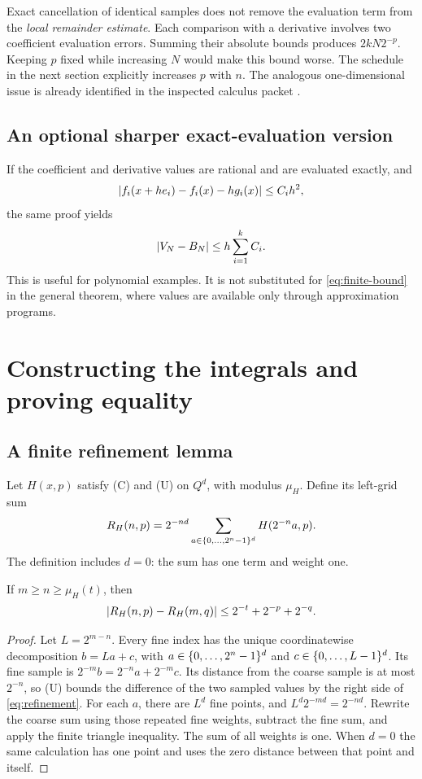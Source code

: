 \begin{remark}
Exact cancellation of identical samples does not remove the evaluation
term from the \emph{local remainder estimate}. Each comparison with a
derivative involves two coefficient evaluation errors. Summing their
absolute bounds produces $2kN2^{-p}$. Keeping $p$ fixed while increasing $N$
would make this bound worse. The schedule in the next section explicitly
increases $p$ with $n$. The analogous one-dimensional issue is already
identified in the inspected calculus packet \cite{repo-calculus}.
\end{remark}

\subsection{An optional sharper exact-evaluation version}

If the coefficient and derivative values are rational and are evaluated
exactly, and
\[
 \left|f_i(x+he_i)-f_i(x)-hg_i(x)\right|\le C_i h^2,
\]
the same proof yields
\[
 \left|V_N-B_N\right|\le h\sum_{i=1}^kC_i.
\]
This is useful for polynomial examples. It is not substituted for
\eqref{eq:finite-bound} in the general theorem, where values are available
only through approximation programs.

\FloatBarrier
\section{Constructing the integrals and proving equality}\label{sec:names-proof}

\subsection{A finite refinement lemma}

Let $H(x,p)$ satisfy (C) and (U) on $Q^d$, with modulus $\mu_H$.
Define its left-grid sum
\[
 R_H(n,p)=2^{-nd}\sum_{a\in\{0,\ldots,2^n-1\}^{d}}H(2^{-n}a,p).
\]
The definition includes $d=0$: the sum has one term and weight one.

\begin{lemma}\label{lem:refinement}
If $m\ge n\ge\mu_H(t)$, then
\begin{equation}\label{eq:refinement}
 \left|R_H(n,p)-R_H(m,q)\right|
 \le2^{-t}+2^{-p}+2^{-q}.
\end{equation}
\end{lemma}
\begin{proof}
Let $L=2^{m-n}$. Every fine index has the unique coordinatewise decomposition
$b=La+c$, with $a\in\{0,\ldots,2^n-1\}^{d}$ and $c\in\{0,\ldots,L-1\}^{d}$.
Its fine sample is $2^{-m}b=2^{-n}a+2^{-m}c$. Its distance from the
coarse sample is at most $2^{-n}$, so (U) bounds the difference of the
two sampled values by the right side of \eqref{eq:refinement}.
For each $a$, there are $L^d$ fine points, and
$L^d2^{-md}=2^{-nd}$. Rewrite the coarse sum using those repeated fine
weights, subtract the fine sum, and apply the finite triangle inequality.
The sum of all weights is one. When $d=0$ the same calculation has one
point and uses the zero distance between that point and itself.
\end{proof}

